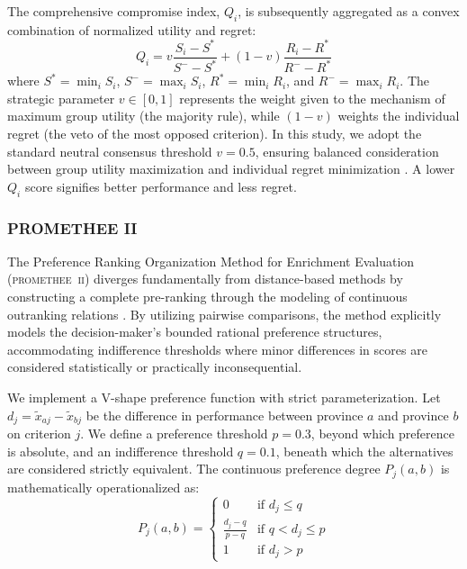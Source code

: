 \documentclass[12pt,a4paper]{article}
\begin{document}
The comprehensive compromise index, \( Q_i \), is subsequently aggregated as a convex combination of normalized utility and regret:
\begin{equation}
    Q_i = v \frac{S_i - S^*}{S^- - S^*} + (1 - v) \frac{R_i - R^*}{R^- - R^*}
\end{equation}
where \( S^* = \min_i S_i \), \( S^- = \max_i S_i \), \( R^* = \min_i R_i \), and \( R^- = \max_i R_i \). The strategic parameter \( v \in [0, 1] \) represents the weight given to the mechanism of maximum group utility (the majority rule), while \( (1-v) \) weights the individual regret (the veto of the most opposed criterion). In this study, we adopt the standard neutral consensus threshold \( v = 0.5 \), ensuring balanced consideration between group utility maximization and individual regret minimization \citep{Opricovic2004}. A lower \( Q_i \) score signifies better performance and less regret.

\subsubsection{PROMETHEE II}
\label{subsubsec:promethee}
The Preference Ranking Organization Method for Enrichment Evaluation (\textsc{promethee~ii}) diverges fundamentally from distance-based methods by constructing a complete pre-ranking through the modeling of continuous outranking relations \citep{Brans1985}. By utilizing pairwise comparisons, the method explicitly models the decision-maker's bounded rational preference structures, accommodating indifference thresholds where minor differences in scores are considered statistically or practically inconsequential.

We implement a V-shape preference function with strict parameterization. Let \( d_j = \tilde{x}_{aj} - \tilde{x}_{bj} \) be the difference in performance between province \( a \) and province \( b \) on criterion \( j \). We define a preference threshold \( p = 0.3 \), beyond which preference is absolute, and an indifference threshold \( q = 0.1 \), beneath which the alternatives are considered strictly equivalent. The continuous preference degree \( P_j(a,b) \) is mathematically operationalized as:
\begin{equation}
    P_j(a,b) = 
    \begin{cases} 
        0 & \text{if } d_j \leq q \\
        \frac{d_j - q}{p - q} & \text{if } q < d_j \leq p \\
        1 & \text{if } d_j > p 
    \end{cases}
\end{equation}
\end{document}
